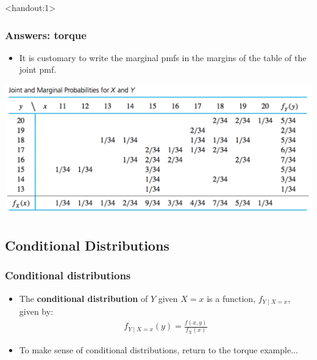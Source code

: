 \documentclass[handout]{beamer}\usepackage{graphicx, color}
\newcommand{\answers}{1}
\numberwithin{equation}{section}
\begin{document}
\begin{frame}<handout:\answers>
\frametitle{Answers: torque}
\begin{itemize}
\item It is customary to write the marginal pmfs in the margins of the table of the joint pmf.
\end{itemize}
 \includegraphics{../../fig/torquetablemar.png}
\end{frame}


\subsection{Conditional Distributions}

\begin{frame}
\frametitle{Conditional distributions}
\begin{itemize}
\pause \item The {\bf conditional distribution} of $Y$ given $X = x$ is a function, $f_{Y \mid X = x}$, given by:
\pause \begin{align*}
f_{Y \mid X = x}(y) = \frac{f(x,y)}{f_X(x)}
\end{align*}
\pause \item To make sense of conditional distributions, return to the torque example...
\end{itemize}
\end{frame}
\end{document}
